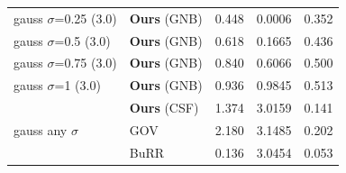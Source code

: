 \begin{tabular}{ll rrr}
\midrule

  \multirow{1}{*}{gauss $\sigma$=0.25 (3.0)} & \textbf{Ours} (GNB) & 0.448 & 0.0006 & 0.352 \\
   \multirow{1}{*}{gauss $\sigma$=0.5 (3.0)} & \textbf{Ours} (GNB) & 0.618 & 0.1665 & 0.436 \\
  \multirow{1}{*}{gauss $\sigma$=0.75 (3.0)} & \textbf{Ours} (GNB) & 0.840 & 0.6066 & 0.500 \\
     \multirow{1}{*}{gauss $\sigma$=1 (3.0)} & \textbf{Ours} (GNB) & 0.936 & 0.9845 & 0.513 \\


\midrule\multirow{3}{*}{gauss any $\sigma$}

   & \textbf{Ours} (CSF) & 1.374 & 3.0159 & 0.141 \\
   &                 GOV & 2.180 & 3.1485 & 0.202 \\
   &                BuRR & 0.136 & 3.0454 & 0.053 \\

		\bottomrule

	\end{tabular}

